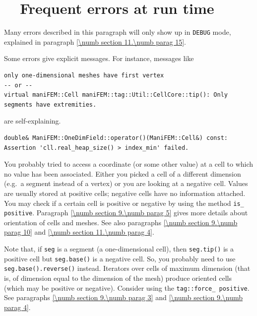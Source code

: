 \section{~~Frequent errors at run time}\label{\numb section 11.\numb parag 14}

Many errors described in this paragraph will only show up in {\small\tt DEBUG} mode,
explained in paragraph \ref{\numb section 11.\numb parag 15}.

Some errors give explicit messages. For instance, messages like

\begin{Verbatim}[commandchars=\\\{\},formatcom=\small\tt,baselinestretch=0.94]
only one-dimensional meshes have first vertex
-- or --
virtual maniFEM::Cell maniFEM::tag::Util::CellCore::tip(): Only segments have extremities. 
\end{Verbatim}

\noindent are self-explaining.

\begin{Verbatim}[commandchars=\\\{\},formatcom=\small\tt,baselinestretch=0.94]
double& ManiFEM::OneDimField::operator()(ManiFEM::Cell&) const:
Assertion 'cll.real_heap_size() > index_min' failed.
\end{Verbatim}

You probably tried to access a coordinate (or some other value) at a cell to which 
no value has been associated.
Either you picked a cell of a different dimension (e.g.\ a segment instead of a
vertex) or you are looking at a negative cell.
Values are usually stored at positive cells; negative cells have no information attached.
You may check if a certain cell is positive or negative by using the method
{\small\tt is\_\,positive}.
Paragraph \ref{\numb section 9.\numb parag 5} gives more details about orientation of
cells and meshes.
See also paragraphs \ref{\numb section 9.\numb parag 10} and
\ref{\numb section 11.\numb parag 4}.

Note that, if {\small\tt seg} is a segment (a one-dimensional cell), then
{\small\tt seg.tip()} is a positive cell but {\small\tt seg.base()} is a negative cell.
So, you probably need to use {\small\tt seg.base().reverse()} instead.
Iterators over cells of maximum dimension (that is, of dimension equal to the dimension
of the mesh) produce oriented cells (which may be positive or negative).
Consider using the {\small\tt \textcolor{tag}{tag}::force\_\,positive}.
See paragraphs \ref{\numb section 9.\numb parag 3} and \ref{\numb section 9.\numb parag 4}.

